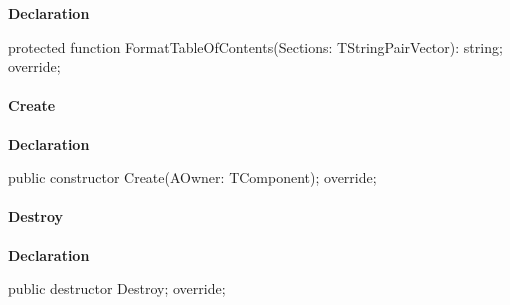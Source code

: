 \documentclass{report}
\newif\ifpdf
\begin{document}
\label{PasDoc_GenHtml.TGenericHTMLDocGenerator-FormatTableOfContents}
\begin{list}{}{
\setlength{\itemindent}{0cm}
\setlength{\listparindent}{0cm}
\setlength{\leftmargin}{\evensidemargin}
\addtolength{\leftmargin}{\tmplength}
\settowidth{\labelsep}{X}
\addtolength{\leftmargin}{\labelsep}
\setlength{\labelwidth}{\tmplength}
}
\item[\textbf{Declaration}\hfill]
\ifpdf
\begin{flushleft}
\fi
\begin{ttfamily}
protected function FormatTableOfContents(Sections: TStringPairVector): string; override;\end{ttfamily}

\ifpdf
\end{flushleft}
\fi

\end{list}
\paragraph*{Create}\hspace*{\fill}

\label{PasDoc_GenHtml.TGenericHTMLDocGenerator-Create}
\begin{list}{}{
\setlength{\itemindent}{0cm}
\setlength{\listparindent}{0cm}
\setlength{\leftmargin}{\evensidemargin}
\addtolength{\leftmargin}{\tmplength}
\settowidth{\labelsep}{X}
\addtolength{\leftmargin}{\labelsep}
\setlength{\labelwidth}{\tmplength}
}
\item[\textbf{Declaration}\hfill]
\ifpdf
\begin{flushleft}
\fi
\begin{ttfamily}
public constructor Create(AOwner: TComponent); override;\end{ttfamily}

\ifpdf
\end{flushleft}
\fi

\end{list}
\paragraph*{Destroy}\hspace*{\fill}

\label{PasDoc_GenHtml.TGenericHTMLDocGenerator-Destroy}
\begin{list}{}{
\setlength{\itemindent}{0cm}
\setlength{\listparindent}{0cm}
\setlength{\leftmargin}{\evensidemargin}
\addtolength{\leftmargin}{\tmplength}
\settowidth{\labelsep}{X}
\addtolength{\leftmargin}{\labelsep}
\setlength{\labelwidth}{\tmplength}
}
\item[\textbf{Declaration}\hfill]
\ifpdf
\begin{flushleft}
\fi
\begin{ttfamily}
public destructor Destroy; override;\end{ttfamily}

\ifpdf
\end{flushleft}
\fi

\end{list}
\end{document}
